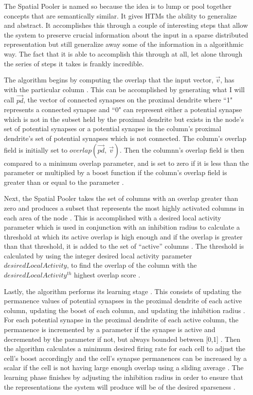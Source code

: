 \documentclass[fleqn,notitlepage,minimal]{article}
\begin{document}
	The Spatial Pooler is named so because the idea is to lump or pool together concepts that are semantically similar. It gives HTMs the ability to generalize and abstract. It accomplishes this through a couple of interesting steps that allow the system to preserve crucial information about the input in a sparse distributed representation but still generalize away some of the information in a algorithmic way. The fact that it is able to accomplish this through at all, let alone through the series of steps it takes is frankly incredible.
	
	The algorithm begins by computing the overlap that the input vector, $\overrightarrow{v}$, has with the particular column \cite{Whitepaper}. This can be accomplished by generating what I will call $\overrightarrow{pd}$, the vector of connected synapses on the proximal dendrite where ``1" represents a connected synapse and ``0" can represent either a potential synapse which is not in the subset held by the proximal dendrite but exists in the node's set of potential synapses or a potential synapse in the column's proximal dendrite's set of potential synapses which is not connected. The column's overlap field is initially set to $overlap(\overrightarrow{pd}, \ \overrightarrow{v})$. Then the columnn's overlap field is then compared to a minimum overlap parameter, and is set to zero if it is less than the parameter or multiplied by a boost function if the column's overlap field is greater than or equal to the parameter \cite{Whitepaper}.
	
	Next, the Spatial Pooler takes the set of columns with an overlap greater than zero and produces a subset that represents the most highly activated columns in each area of the node \cite{Principles}. This is accomplished with a desired local activity parameter which is used in conjunction with an inhibition radius to calculate a threshold at which its active overlap is high enough and if the overlap is greater than that threshold, it is added to the set of ``active'' columns \cite{Whitepaper}. The threshold is calculated by using the integer desired local activity parameter $desiredLocalActivity$, to find the overlap of the column with the $desiredLocalActivity^{th}$ highest overlap score \cite{Whitepaper}.
	
	Lastly, the algorithm performs its learning stage \cite{Whitepaper}. This consists of updating the permanence values of potential synapses in the proximal dendrite of each active column, updating the boost of each column, and updating the inhibition radius \cite{Whitepaper}. For each potential synapse in the proximal dendrite of each active column, the permanence is incremented by a parameter if the synapse is active and decremented by the parameter if not, but always bounded between [0,1] \cite{Whitepaper}. Then the algorithm calculates a minimum desired firing rate for each cell to adjust the cell's boost accordingly and the cell's synapse permanences can be increased by a scalar if the cell is not having large enough overlap using a sliding average \cite{Whitepaper}. The learning phase finishes by adjusting the inhibition radius in order to ensure that the representations the system will produce will be of the desired sparseness \cite{Whitepaper}.
	
\end{document}
